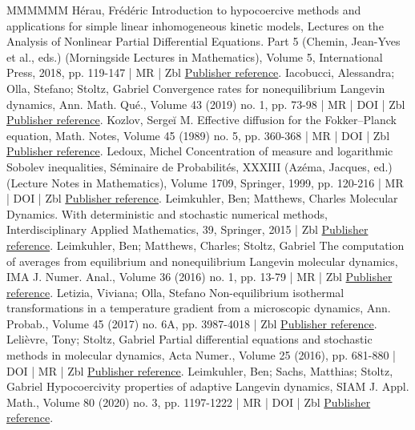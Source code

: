 \documentclass[10pt,a4paper]{article}
\numberwithin{equation}{section}
\begin{document}
\begin{thebibliography}{MMMMMM}
 Hérau, Frédéric Introduction to hypocoercive methods and applications for simple linear inhomogeneous kinetic models, Lectures on the Analysis of Nonlinear Partial Differential Equations. Part 5 (Chemin, Jean-Yves et al., eds.) (Morningside Lectures in Mathematics), Volume 5, International Press, 2018, pp. 119-147 | MR | Zbl \href{https://ahl.centre-mersenne.org/item/AHL_2022__5__523_0/#Herau16}{Publisher reference}.
 Iacobucci, Alessandra; Olla, Stefano; Stoltz, Gabriel Convergence rates for nonequilibrium Langevin dynamics, Ann. Math. Qué., Volume 43 (2019) no. 1, pp. 73-98 | MR | DOI | Zbl \href{https://ahl.centre-mersenne.org/item/AHL_2022__5__523_0/#IOS19}{Publisher reference}.
 Kozlov, Sergeĭ M. Effective diffusion for the Fokker–Planck equation, Math. Notes, Volume 45 (1989) no. 5, pp. 360-368 | MR | DOI | Zbl \href{https://ahl.centre-mersenne.org/item/AHL_2022__5__523_0/#Kozlov89}{Publisher reference}.
 Ledoux, Michel Concentration of measure and logarithmic Sobolev inequalities, Séminaire de Probabilités, XXXIII (Azéma, Jacques, ed.) (Lecture Notes in Mathematics), Volume 1709, Springer, 1999, pp. 120-216 | MR | DOI | Zbl \href{https://ahl.centre-mersenne.org/item/AHL_2022__5__523_0/#Led99}{Publisher reference}.
 Leimkuhler, Ben; Matthews, Charles Molecular Dynamics. With deterministic and stochastic numerical methods, Interdisciplinary Applied Mathematics, 39, Springer, 2015 | Zbl \href{https://ahl.centre-mersenne.org/item/AHL_2022__5__523_0/#LM15}{Publisher reference}.
 Leimkuhler, Ben; Matthews, Charles; Stoltz, Gabriel The computation of averages from equilibrium and nonequilibrium Langevin molecular dynamics, IMA J. Numer. Anal., Volume 36 (2016) no. 1, pp. 13-79 | MR | Zbl \href{https://ahl.centre-mersenne.org/item/AHL_2022__5__523_0/#LMS16}{Publisher reference}.
 Letizia, Viviana; Olla, Stefano Non-equilibrium isothermal transformations in a temperature gradient from a microscopic dynamics, Ann. Probab., Volume 45 (2017) no. 6A, pp. 3987-4018 | Zbl \href{https://ahl.centre-mersenne.org/item/AHL_2022__5__523_0/#OL15}{Publisher reference}.
 Lelièvre, Tony; Stoltz, Gabriel Partial differential equations and stochastic methods in molecular dynamics, Acta Numer., Volume 25 (2016), pp. 681-880 | DOI | MR | Zbl \href{https://ahl.centre-mersenne.org/item/AHL_2022__5__523_0/#LS16}{Publisher reference}.
 Leimkuhler, Ben; Sachs, Matthias; Stoltz, Gabriel Hypocoercivity properties of adaptive Langevin dynamics, SIAM J. Appl. Math., Volume 80 (2020) no. 3, pp. 1197-1222 | MR | DOI | Zbl \href{https://ahl.centre-mersenne.org/item/AHL_2022__5__523_0/#LSS19}{Publisher reference}.

\end{thebibliography}
\end{document}

